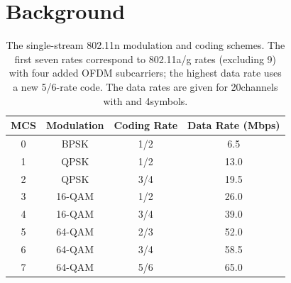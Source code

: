 \ifx\mainfile\undefined

\setcounter{chapter}{1} %
\fi

\cleardoublepage
\chapter{Background}
\label{chap:background}

\begin{table}
\centering
\begin{tabular}{cccc}
\toprule
MCS & Modulation & Coding Rate & Data Rate (Mbps) \\
\midrule
0 & BPSK & 1/2 & 6.5 \\
1 & QPSK & 1/2 & 13.0\\
2 & QPSK & 3/4 & 19.5\\
3 & 16-QAM & 1/2 & 26.0\\
4 & 16-QAM & 3/4 & 39.0\\
5 & 64-QAM & 2/3 & 52.0\\
6 & 64-QAM & 3/4 & 58.5\\
7 & 64-QAM & 5/6 & 65.0\\
\bottomrule
\end{tabular}
\caption[The 802.11n single-stream rates.]{\label{tab:siso_mcs} The single-stream 802.11n modulation and coding schemes. The first seven rates correspond to 802.11a/g rates (excluding 9\Mbps) with four added OFDM subcarriers; the highest data rate uses a new 5/6-rate code. The data rates are given for 20\MHz channels with and 4\ms symbols.}
\end{table}

